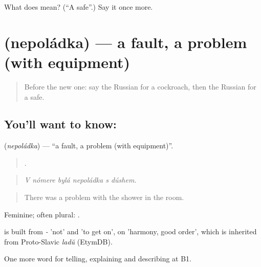 \begin{tcolorbox}[breakable,colback=teal!4,colframe=teal!35!black,title={Before you move on}]
What does  mean? (\textquotedblleft{}A safe\textquotedblright{}.) Say it once more.
\end{tcolorbox}
\section[\texorpdfstring{\ru{неполадка} (nepoládka)}{неполадка (nepoládka)}]{ (nepoládka) — a fault, a problem (with equipment)}

\label{lesson:RU-C433-nepoladka}



\begin{quote}
Before the new one: say the Russian for a cockroach, then the Russian for a safe.
\end{quote}

\subsection*{You'll want to know: }
\textbf{} (\emph{nepoládka}) — \textquotedblleft{}a fault, a problem (with equipment)\textquotedblright{}.

\begin{quote}
     .
\end{quote}

\begin{quote}
\emph{V nómere bylá nepoládka s dúshem.}
\end{quote}

\begin{quote}
There was a problem with the shower in the room.
\end{quote}

Feminine; often plural: \emph{}.

\begin{cousinweb}
\emph{} is built from \emph{-} 'not' and \emph{} 'to get on', on \emph{} 'harmony, good order', which is inherited from Proto-Slavic \emph{ladŭ} (EtymDB).
\end{cousinweb}

\begin{grammarlens}[title={What you've built}]
One more word for telling, explaining and describing at B1.
\end{grammarlens}

